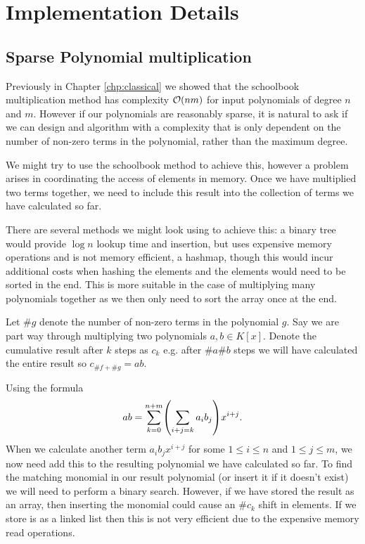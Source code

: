 \chapter{Implementation Details}\label{chp:implementation}

\section{Sparse Polynomial multiplication}

Previously in Chapter \ref{chp:classical} we showed that the schoolbook multiplication method has complexity $\mathcal O(nm)$ for input polynomials of degree $n$ and $m$. However if our polynomials are reasonably sparse, it is natural to ask if we can design and algorithm with a complexity that is only dependent on the number of non-zero terms in the polynomial, rather than the maximum degree.

We might try to use the schoolbook method to achieve this, however a problem arises in coordinating the access of elements in memory. Once we have multiplied two terms together, we need to include this result into the collection of terms we have calculated so far.

There are several methods we might look using to achieve this: a binary tree would provide $\log n$ lookup time and insertion, but uses expensive memory operations and is not memory efficient, a hashmap, though this would incur additional costs when hashing the elements and the elements would need to be sorted in the end. This is more suitable in the case of multiplying many polynomials together as we then only need to sort the array once at the end.

Let $\# g$ denote the number of non-zero terms in the polynomial $g$. Say we are part way through multiplying two polynomials $a, b \in K[x]$. Denote the cumulative result after $k$ steps as $c_k$ e.g. after $\# a \# b$ steps we will have calculated the entire result so $c_{\#f + \#g} = ab$.


Using the formula
\[
    ab = \sum^{n + m}_{k=0} \bb{\sum_{i + j = k}a_ib_j} x^{i + j}.
\]
When we calculate another term $a_ib_j x^{i + j}$ for some $1 \le i \le n$ and $1 \le j \le m$, we now need add this to the resulting polynomial we have calculated so far. To find the matching monomial in our result polynomial (or insert it if it doesn't exist) we will need to perform a binary search. However, if we have stored the result as an array, then inserting the monomial could cause an $\#c_k$ shift in elements. If we store is as a linked list then this is not very efficient due to the expensive memory read operations.

